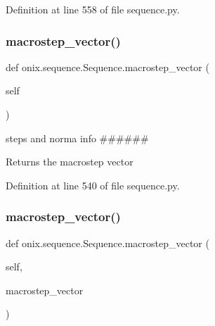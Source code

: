 Definition at line 558 of file sequence.\+py.

\mbox{\label{classonix_1_1sequence_1_1Sequence_a2ae5761c119ef41525c82c5db6b9af33}} 
\subsubsection{\texorpdfstring{macrostep\+\_\+vector()}{macrostep\_vector()}\hspace{0.1cm}{\footnotesize\ttfamily [1/2]}}
{\footnotesize\ttfamily def onix.\+sequence.\+Sequence.\+macrostep\+\_\+vector (\begin{DoxyParamCaption}\item[{}]{self }\end{DoxyParamCaption})}



steps and norma info \#\#\#\#\#\# 

\begin{DoxyVerb}Returns the macrostep vector\end{DoxyVerb}
 

Definition at line 540 of file sequence.\+py.

\mbox{\label{classonix_1_1sequence_1_1Sequence_ae0620ce8e449bf0a6a4181b179b6d0d9}} 
\subsubsection{\texorpdfstring{macrostep\+\_\+vector()}{macrostep\_vector()}\hspace{0.1cm}{\footnotesize\ttfamily [2/2]}}
{\footnotesize\ttfamily def onix.\+sequence.\+Sequence.\+macrostep\+\_\+vector (\begin{DoxyParamCaption}\item[{}]{self,  }\item[{}]{macrostep\+\_\+vector }\end{DoxyParamCaption})}

